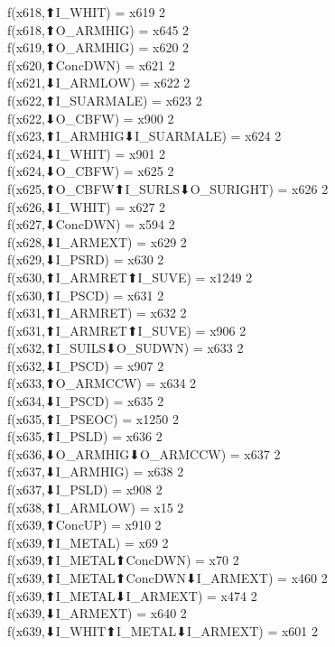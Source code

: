 f(x618,⬆I_WHIT) = x619 {2} \\
f(x618,⬆O_ARMHIG) = x645 {2} \\
f(x619,⬆O_ARMHIG) = x620 {2} \\
f(x620,⬆ConcDWN) = x621 {2} \\
f(x621,⬇I_ARMLOW) = x622 {2} \\
f(x622,⬆I_SUARMALE) = x623 {2} \\
f(x622,⬇O_CBFW) = x900 {2} \\
f(x623,⬆I_ARMHIG⬇I_SUARMALE) = x624 {2} \\
f(x624,⬇I_WHIT) = x901 {2} \\
f(x624,⬇O_CBFW) = x625 {2} \\
f(x625,⬆O_CBFW⬆I_SURLS⬇O_SURIGHT) = x626 {2} \\
f(x626,⬇I_WHIT) = x627 {2} \\
f(x627,⬇ConcDWN) = x594 {2} \\
f(x628,⬇I_ARMEXT) = x629 {2} \\
f(x629,⬇I_PSRD) = x630 {2} \\
f(x630,⬆I_ARMRET⬆I_SUVE) = x1249 {2} \\
f(x630,⬆I_PSCD) = x631 {2} \\
f(x631,⬆I_ARMRET) = x632 {2} \\
f(x631,⬆I_ARMRET⬆I_SUVE) = x906 {2} \\
f(x632,⬆I_SUILS⬇O_SUDWN) = x633 {2} \\
f(x632,⬇I_PSCD) = x907 {2} \\
f(x633,⬆O_ARMCCW) = x634 {2} \\
f(x634,⬇I_PSCD) = x635 {2} \\
f(x635,⬆I_PSEOC) = x1250 {2} \\
f(x635,⬆I_PSLD) = x636 {2} \\
f(x636,⬇O_ARMHIG⬇O_ARMCCW) = x637 {2} \\
f(x637,⬇I_ARMHIG) = x638 {2} \\
f(x637,⬇I_PSLD) = x908 {2} \\
f(x638,⬆I_ARMLOW) = x15 {2} \\
f(x639,⬆ConcUP) = x910 {2} \\
f(x639,⬆I_METAL) = x69 {2} \\
f(x639,⬆I_METAL⬆ConcDWN) = x70 {2} \\
f(x639,⬆I_METAL⬆ConcDWN⬇I_ARMEXT) = x460 {2} \\
f(x639,⬆I_METAL⬇I_ARMEXT) = x474 {2} \\
f(x639,⬇I_ARMEXT) = x640 {2} \\
f(x639,⬇I_WHIT⬆I_METAL⬇I_ARMEXT) = x601 {2} \\
